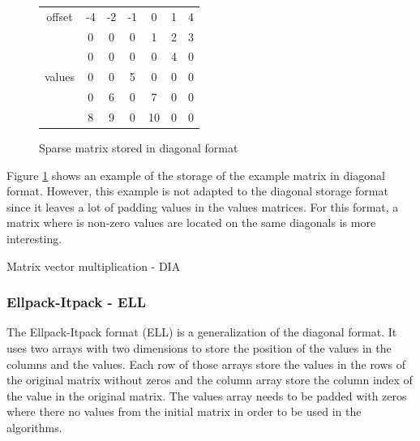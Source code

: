 \begin{figure}[h]
\centering
\begin{tabular}{c|cccccc|}
	\cline{2-7}
	        offset          & -4 & -2 & -1 & 0  & 1 & 4 \\ \cline{2-7}
	\multirow{5}{*}{values} & 0  & 0  & 0  & 1  & 2 & 3 \\
	                        & 0  & 0  & 0  & 0  & 4 & 0 \\
	                        & 0  & 0  & 5  & 0  & 0 & 0 \\
	                        & 0  & 6  & 0  & 7  & 0 & 0 \\
	                        & 8  & 9  & 0  & 10 & 0 & 0 \\ \cline{2-7}
\end{tabular}
\caption{Sparse matrix stored in diagonal format \label{fig:methods:dia_ex}}
\end{figure}

Figure \ref{fig:methods:dia_ex} shows an example of the storage of the example matrix in diagonal format.
However, this example is not adapted to the diagonal storage format since it leaves a lot of padding values in the values matrices.
For this format, a matrix where is non-zero values are located on the same diagonals is more interesting.

\begin{algorithm}[h]
	\DontPrintSemicolon
	\caption{Matrix vector multiplication - DIA\label{fig:methods:dia_algo}}
\end{algorithm}


\subsubsection{Ellpack-Itpack - ELL}
The Ellpack-Itpack format (ELL) is a generalization of the diagonal format.
It uses two arrays with two dimensions to store the position of the values in the columns and the values.
Each row of those arrays store the values in the rows of the original matrix without zeros and the column array store the column index of the value in the original matrix.
The values array needs to be padded with zeros where there no values from the initial matrix in order to be used in the algorithms.

